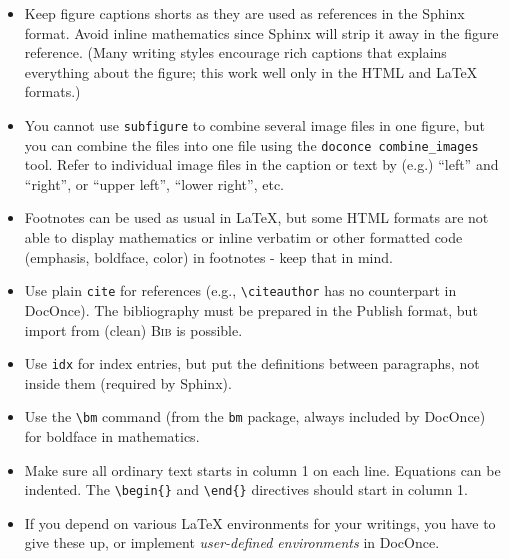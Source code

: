 \documentclass[%
oneside,                 %
final,                   %
10pt]{article}
\newcounter{doconce:movie:counter}
\begin{document}
\begin{itemize}
   for reference\footnote{There is an exception: by using \emph{user-defined environments} within \Verb?!bu-name? and \Verb?!eu-name? directives, it is possible to label any type of text and refer to it. For example, one can have environments for examples, tables, code snippets, theorems, lemmas, etc. One can also use Mako functions to implement environments.} (refer to inline elements by a section label).
   The reason is that floating elements are in general
   not used in web documents, but we made an exception with figures
   and movies.
 \item Keep figure captions shorts as they are used as references in the
   Sphinx format. Avoid inline mathematics since Sphinx will strip it
   away in the figure reference.
   (Many writing styles encourage rich captions that
   explains everything about the figure; this work well
   only in the HTML and {\LaTeX} formats.)
 \item You cannot use \texttt{subfigure} to combine several image files in one
   figure, but you can combine the files into one file using
   the \Verb!doconce combine_images! tool. Refer to individual image files
   in the caption or text by (e.g.) ``left'' and ``right'', or
   ``upper left'', ``lower right'', etc.
 \item Footnotes can be used as usual in {\LaTeX}, but some HTML formats are not
   able to display mathematics or inline verbatim or other formatted
   code (emphasis, boldface, color) in footnotes - keep that in mind.
 \item Use plain \texttt{cite} for references (e.g., \Verb!\citeauthor! has no counterpart
   in DocOnce). The bibliography must be prepared in the Publish format,
   but import from (clean) \textsc{Bib}\negthinspace{\TeX} is possible.
 \item Use \texttt{idx} for index entries, but put the definitions between paragraphs,
   not inside them (required by Sphinx).
 \item Use the \Verb!\bm! command (from the \texttt{bm} package, always included by DocOnce)
   for boldface in mathematics.
 \item Make sure all ordinary text starts in column 1 on each line. Equations
   can be indented. The \Verb!\begin{}! and \Verb!\end{}! directives should start
   in column 1.
 \item If you depend on various {\LaTeX} environments for your writings, you have
   to give these up, or implement \emph{user-defined environments} in DocOnce.

\end{itemize}
\end{document}
